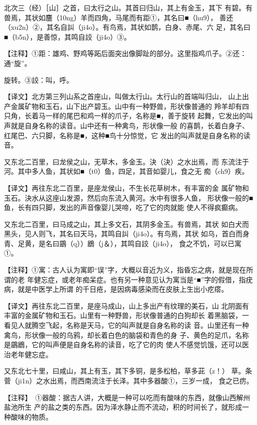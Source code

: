 \documentclass[a4paper,12pt,UTF8,twoside]{ctexbook}
\begin{document}
北次三（经）［山］之首，曰太行之山。其首曰归山，其上有金玉，其下 有碧。有兽焉，其状如麢（10ng）羊而四角，马尾而有距①，其名曰■（hu9）， 善还（xu2n）②，其名自訆（ji4o）。有鸟焉，其状如鹊，白身、赤尾、六 足，其名曰■（b5n），是善惊，其鸣自詨（ji4o）③。

【注释】①距：雄鸡、野鸡等跖后面突出像脚趾的部分。这里指鸡爪子。②还：通“旋”。

旋转。③詨：叫，呼。

【译文】北方第三列山系之首座山，叫做太行山。太行山的首端叫归山， 山上出产金属矿物和玉石，山下出产碧玉。山中有一种野兽，形状像普通的 羚羊却有四只角，长着马一样的尾巴和鸡一样的爪子，名称是■，善于旋转 起舞，它发出的叫声就是自身名称的读音。山中还有一种禽鸟，形状像一般 的喜鹊，长着白身子、红尾巴、六只脚，名称是■，这种■鸟十分惊觉，它 发出的叫声就是自身名称的读音。

又东北二百里，曰龙侯之山，无草木，多金玉。決（決）之水出焉，而 东流注于河。其中多人鱼，其状如■（t0）鱼，四足，其音如婴儿，食之无 痴（ch9）疾。

【译文】再往东北二百里，是座龙侯山，不生长花草树木，有丰富的金 属矿物和玉石。決水从这座山发源，然后向东流入黄河。水中有很多人鱼， 形状像一般的■鱼，长有四只脚，发出的声音像婴儿哭啼，吃了它的肉就能 使人不得疯癫病。

又东北二百里，曰马成之山，其上多文石，其阴多金玉。有兽焉，其状 如白犬而黑头，见人则飞，其名曰天马，其鸣自訆（ji4o）。有鸟焉，其状 如乌，首白而身青、足黄，是名曰鶌（q））鶋（j＆），其鸣自詨（ji4o）， 食之不饥，可以已寓①。

【注释】①寓：古人认为寓即“误”字，大概以音近为义，指昏忘之病，就是现在所谓的老 年健忘症，或老年痴呆症。也有另一种意见认为寓当是“■”字的假借，指疣病，就是中医学上所谓 的千日疮，是因病毒感染而在皮肤上生出小疙瘩。

【译文】再往东北二百里，是座马成山，山上多出产有纹理的美石，山 北阴面有丰富的金属矿物和玉石。山里有一种野兽，形状像普通的白狗却长 着黑脑袋，一看见人就腾空飞起，名称是天马，它的叫声就是自身名称的读 音。山里还有一种禽鸟，形状像一般的乌鸦，却长着白色的脑袋和青色的身 子、黄色的足爪，名称是鶌鶋，它的叫声便是自身名称的读音，吃了它的肉 使人不感觉饥饿，还可以医治老年健忘症。

又东北七十里，曰咸山，其上有玉，其下多铜，是多松柏，草多茈（z！） 草。条菅（ji1n）之水出焉，而西南流注于长泽。其中多器酸①，三岁一成， 食之已疠。

【注释】　①器酸：据古人讲，大概是一种可以吃而有酸味的东西，就像山西解州盐池所生 产的盐之类的东西。因为泽水静止而不流动，积的时间长了，就形成一种酸味的物质。
\end{document}
